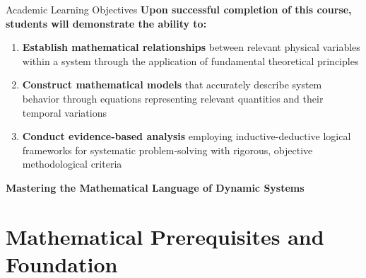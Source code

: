 \documentclass[10pt,aspectratio=169]{beamer}
\newcommand{\highlight}[1]{\textcolor{mLightBrown}{\textbf{#1}}}
\newcommand{\concept}[1]{\textcolor{mDarkTeal}{\textbf{#1}}}
\begin{document}
\begin{frame}{Academic Learning Objectives}
    \concept{Upon successful completion of this course, students will demonstrate the ability to:}
    
    \vspace{0.4cm}
    
    \begin{enumerate}
        \item \highlight{Establish mathematical relationships} between relevant physical variables within a system through the application of fundamental theoretical principles
        
        \vspace{0.3cm}
        
        \item \highlight{Construct mathematical models} that accurately describe system behavior through equations representing relevant quantities and their temporal variations
        
        \vspace{0.3cm}
        
        \item \highlight{Conduct evidence-based analysis} employing inductive-deductive logical frameworks for systematic problem-solving with rigorous, objective methodological criteria
    \end{enumerate}
    
    \vspace{0.4cm}
    
    \begin{center}
        \textcolor{mLightBrown}{\large\textbf{Mastering the Mathematical Language of Dynamic Systems}}
    \end{center}
\end{frame}

\section{Mathematical Prerequisites and Foundation}
\end{document}
